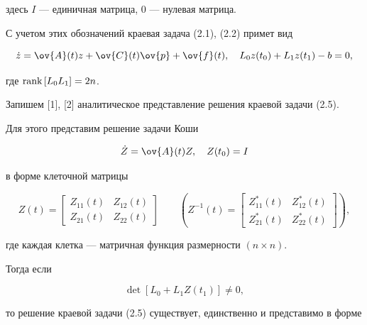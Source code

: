 здесь $I$ --- единичная матрица, 0 --- нулевая матрица.


С учетом этих обозначений краевая задача (2.1), (2.2) примет вид


\begin{equation}


\Dot {z}=\ov {A}(t)z+\ov {C}(t)\ov {p}+\ov {f}(t),\quad


L_{0}z(t_{0})+L_{1}z(t_{1})-b=0,


\end{equation}


где $\text{rank\,}[L_{0}L_{1}]=2n$.





Запишем [1], [2] аналитическое представление решения краевой задачи (2.5).


Для этого представим решение задачи Коши


\begin{equation}


\Dot {Z}=\ov {A}(t)Z,\quad Z(t_{0})=I


\end{equation}


в форме клеточной матрицы


$$


Z(t)=\begin{bmatrix} Z_{11}(t)&Z_{12}(t)\\ Z_{21}(t)&Z_{22}(t)


\end{bmatrix}


\qquad


\left(Z^{-1}(t)=\begin{bmatrix}


Z^{\ast }_{11}(t)&Z^{\ast }_{12}(t)\\


Z^{\ast }_{21}(t)&Z^{\ast }_{22}(t)


\end{bmatrix}\right),


$$


где каждая клетка --- матричная функция размерности $(n\times n)$.


Тогда если 


\begin{equation}


\det [L_{0}+L_{1}Z(t_{1})]\neq 0, 


\end{equation}


то решение краевой задачи (2.5) существует, единственно и представимо в форме


